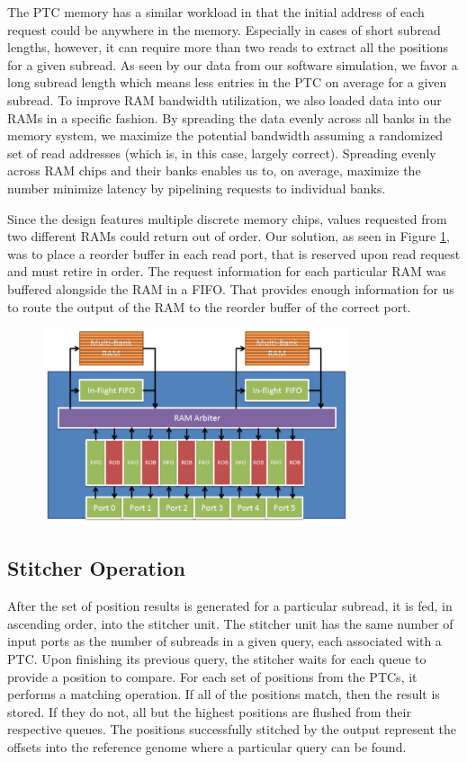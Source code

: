\documentclass[11pt]{article}
\begin{document}
The PTC memory has a similar workload in that the initial address of each request could be anywhere in the memory.  Especially in cases of short subread lengths, however, it can require more than two reads to extract all the positions for a given subread.  As seen by our data from our software simulation, we favor a long subread length which means less entries in the PTC on average for a given subread.  To improve RAM bandwidth utilization, we also loaded data into our RAMs in a specific fashion.  By spreading the data evenly across all banks in the memory system, we maximize the potential bandwidth assuming a randomized set of read addresses (which is, in this case, largely correct).  Spreading evenly across RAM chips and their banks enables us to, on average, maximize the number minimize latency by pipelining requests to individual banks.

Since the design features multiple discrete memory chips, values requested from two different RAMs could return out of order.   Our solution, as seen in Figure \ref{rammodel}, was to place a reorder buffer in each read port, that is reserved upon read request and must retire in order.  The request information for each particular RAM was buffered alongside the RAM in a FIFO.  That provides enough information for us to route the output of the RAM to the reorder buffer of the correct port.  
\begin{figure}[ht!]
\centering
\includegraphics[width=90mm]{rammodel.png}
\caption{}
\label{rammodel}
\end{figure}

\subsection{Stitcher Operation}
After the set of position results is generated for a particular subread, it is fed, in ascending order, into the stitcher unit.  The stitcher unit has the same number of input ports as the number of subreads in a given query, each associated with a PTC.  Upon finishing its previous query, the stitcher waits for each queue to provide a position to compare.  For each set of positions from the PTCs, it performs a matching operation.  If all of the positions match, then the result is stored.  If they do not, all but the highest positions are flushed from their respective queues.  The positions successfully stitched by the output represent the offsets into the reference genome where a particular query can be found.
\end{document}
